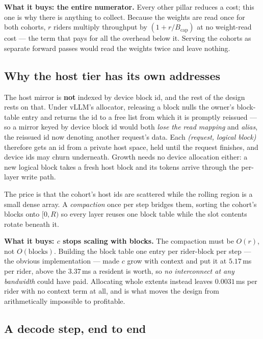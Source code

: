 \textbf{What it buys: the entire numerator.} Every other pillar reduces a cost;
this one is why there is anything to collect. Because the weights are read once for
both cohorts, $r$ riders multiply throughput by $(1 + r/B_{\mathrm{cap}})$ at no
weight-read cost --- the term that pays for all the overhead below it. Serving the
cohorts as separate forward passes would read the weights twice and leave nothing.

\subsection{Why the host tier has its own addresses}
\label{sec:design:spaces}

The host mirror is \textbf{not} indexed by device block id, and the rest of the
design rests on that. Under vLLM's allocator, releasing a block nulls the owner's
block-table entry and returns the id to a free list from which it is promptly
reissued --- so a mirror keyed by device block id would both \emph{lose the read
mapping} and \emph{alias}, the reissued id now denoting another request's data. Each
\emph{(request, logical block)} therefore gets an id from a private host space, held
until the request finishes, and device ids may churn underneath. Growth needs no
device allocation either: a new logical block takes a fresh host block and its
tokens arrive through the per-layer write path.

The price is that the cohort's host ids are scattered while the rolling region is a
small dense array. A \emph{compaction} once per step bridges them, sorting the
cohort's blocks onto $[0,R)$ so every layer reuses one block table while the slot
contents rotate beneath it.

\textbf{What it buys: $c$ stops scaling with blocks.} The compaction must be
$O(r)$, not $O(\text{blocks})$. Building the block table one entry per rider-block
per step --- the obvious implementation --- made $c$ grow with context and put it
at $5.17$\,ms per rider, above the $3.37$\,ms a resident is worth, so \emph{no
interconnect at any bandwidth} could have paid. Allocating whole extents instead
leaves $0.0031$\,ms per rider with no context term at all, and is what moves the
design from arithmetically impossible to profitable.

\subsection{A decode step, end to end}
\label{sec:design:step}

